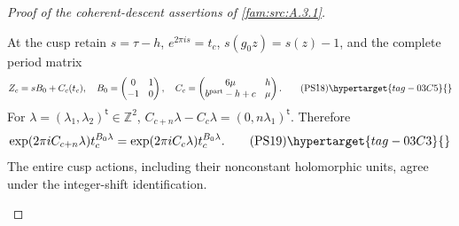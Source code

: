 \begin{proof}[Proof of the coherent-descent assertions of \cref{fam:src:A.3.1}]
\begin{enumerate}[label=\arabic*.,leftmargin=*]
At the cusp retain $s=\tau-h$, $e^{2\pi is}=t_c$, $s(g_0z)=s(z)-1$,
and the complete period matrix
\[
 Z_c=sB_0+C_c(t_c),\quad
 B_0=\begin{pmatrix}0&1\\-1&0\end{pmatrix},\quad
 C_c=\begin{pmatrix}6\mu&h\\ b^{\mathrm{part}}-h+c&\mu\end{pmatrix}.
 \tag{PS18}\hypertarget{tag-03C5}{}\label{wb:pshift:eq:cusp-periods}
\]
For $\lambda=(\lambda_1,\lambda_2)^{\mathsf t}\in\mathbb Z^2$,
$C_{c+n}\lambda-C_c\lambda=(0,n\lambda_1)^{\mathsf t}$. Therefore
\[
 \exp(2\pi iC_{c+n}\lambda)t_c^{B_0\lambda}
       =\exp(2\pi iC_c\lambda)t_c^{B_0\lambda}.
 \tag{PS19}\hypertarget{tag-03C3}{}\label{wb:pshift:eq:cusp-actions-identical}
\]
The entire cusp actions, including their nonconstant holomorphic units,
agree under the integer-shift identification.


\end{enumerate}
\end{proof}

